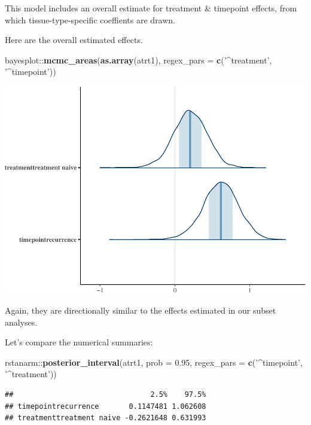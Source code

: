 \documentclass[]{article}
\newenvironment{Shaded}{\begin{snugshade}}{\end{snugshade}}
\newcommand{\KeywordTok}[1]{\textcolor[rgb]{0.13,0.29,0.53}{\textbf{{#1}}}}
\newcommand{\DataTypeTok}[1]{\textcolor[rgb]{0.13,0.29,0.53}{{#1}}}
\newcommand{\FloatTok}[1]{\textcolor[rgb]{0.00,0.00,0.81}{{#1}}}
\newcommand{\StringTok}[1]{\textcolor[rgb]{0.31,0.60,0.02}{{#1}}}
\newcommand{\NormalTok}[1]{{#1}}
\begin{document}
This model includes an overall estimate for treatment \& timepoint
effects, from which tissue-type-specific coeffients are drawn.

Here are the overall estimated effects.

\begin{Shaded}
\begin{Highlighting}[]
\NormalTok{bayesplot::}\KeywordTok{mcmc_areas}\NormalTok{(}\KeywordTok{as.array}\NormalTok{(atrt1), }\DataTypeTok{regex_pars =} \KeywordTok{c}\NormalTok{(}\StringTok{'^treatment'}\NormalTok{, }\StringTok{'^timepoint'}\NormalTok{))}
\end{Highlighting}
\end{Shaded}

\includegraphics{Hierarchical_model_mutations_and_peptides_files/figure-latex/allsamp-atrt1-coef-plot-1.pdf}

Again, they are directionally similar to the effects estimated in our
subset analyses.

Let's compare the numerical summaries:

\begin{Shaded}
\begin{Highlighting}[]
\NormalTok{rstanarm::}\KeywordTok{posterior_interval}\NormalTok{(atrt1, }\DataTypeTok{prob =} \FloatTok{0.95}\NormalTok{, }\DataTypeTok{regex_pars =} \KeywordTok{c}\NormalTok{(}\StringTok{'^timepoint'}\NormalTok{, }\StringTok{'^treatment'}\NormalTok{))}
\end{Highlighting}
\end{Shaded}

\begin{verbatim}
##                                2.5%    97.5%
## timepointrecurrence       0.1147481 1.062608
## treatmenttreatment naive -0.2621648 0.631993
\end{verbatim}
\end{document}
